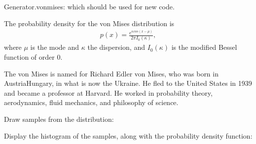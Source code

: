 \documentclass[letterpaper,10pt,english]{sphinxmanual}
\begin{document}
\begin{fulllineitems}
\begin{description}
\end{description}

Generator.vonmises: which should be used for new code.

The probability density for the von Mises distribution is
\begin{equation*}
\begin{split}p(x) = \frac{e^{\kappa cos(x-\mu)}}{2\pi I_0(\kappa)},\end{split}
\end{equation*}
where \(\mu\) is the mode and \(\kappa\) the dispersion,
and \(I_0(\kappa)\) is the modified Bessel function of order 0.

The von Mises is named for Richard Edler von Mises, who was born in
Austria\sphinxhyphen{}Hungary, in what is now the Ukraine.  He fled to the United
States in 1939 and became a professor at Harvard.  He worked in
probability theory, aerodynamics, fluid mechanics, and philosophy of
science.

Draw samples from the distribution:

\begin{sphinxVerbatim}[commandchars=\\\{\}]
     
    
\end{sphinxVerbatim}

Display the histogram of the samples, along with
the probability density function:


\end{fulllineitems}
\end{document}
